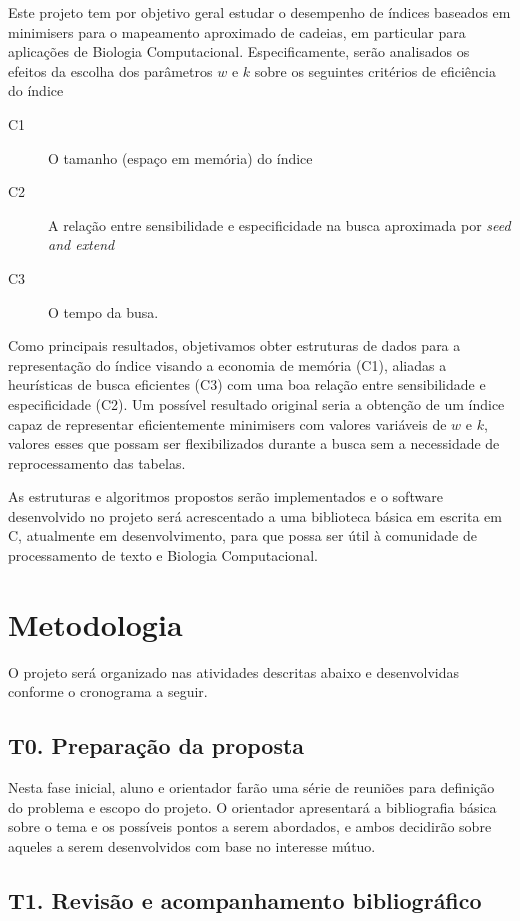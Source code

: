 \documentclass[12pt, a4paper, oneside]{article}
\begin{document}
Este projeto tem por objetivo geral estudar o desempenho de índices baseados em minimisers para o mapeamento aproximado de cadeias, em particular para aplicações de Biologia Computacional. Especificamente, serão analisados  os efeitos da escolha dos parâmetros $w$ e $k$ sobre os seguintes critérios de eficiência do índice
\begin{description}
\item[C1] O tamanho (espaço em memória) do índice
\item[C2] A relação entre sensibilidade e especificidade na busca aproximada por \emph{seed and extend}
\item[C3] O tempo da busa.
\end{description}
Como principais resultados, objetivamos obter estruturas de dados para a representação do índice visando a economia de memória (C1), aliadas a heurísticas de busca eficientes (C3) com uma boa relação entre sensibilidade e especificidade (C2). Um possível resultado original seria a obtenção de um índice capaz de representar eficientemente minimisers com valores variáveis de $w$ e $k$, valores esses que possam ser flexibilizados durante a busca sem a necessidade de reprocessamento das tabelas.

As estruturas e algoritmos propostos serão implementados e o  software desenvolvido no projeto será acrescentado a uma biblioteca básica em escrita em C, atualmente em desenvolvimento, para que possa ser útil à comunidade de processamento de texto e Biologia Computacional.


\clearpage
\section{Metodologia}

O projeto será organizado nas atividades descritas abaixo e desenvolvidas conforme o cronograma a seguir.

\subsection*{T0. Preparação da proposta}

Nesta fase inicial, aluno e orientador farão uma série de reuniões para definição do problema e escopo do projeto. O orientador apresentará a bibliografia básica sobre o tema e os possíveis pontos a serem abordados, e ambos decidirão sobre aqueles a serem desenvolvidos com base no  interesse mútuo.

\subsection*{T1. Revisão e acompanhamento bibliográfico}
\end{document}
